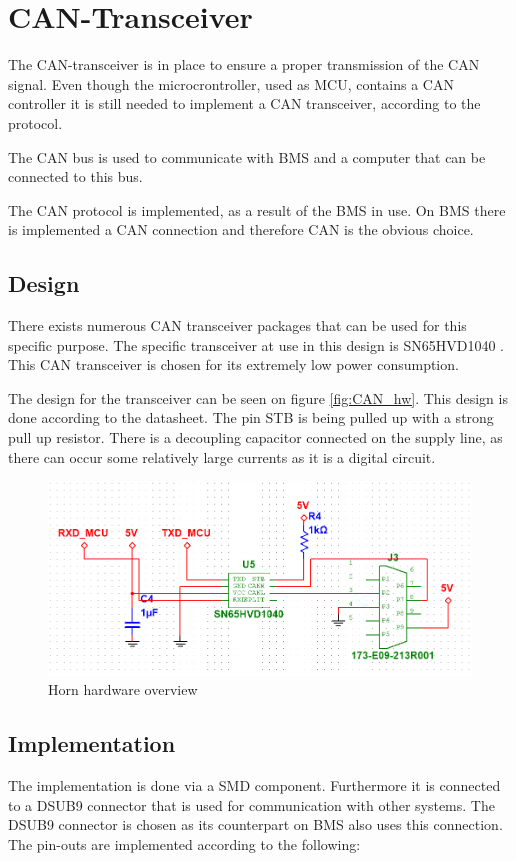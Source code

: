 \newpage
\section{CAN-Transceiver}
\label{sec:CAN-Tranceiver}
The CAN-transceiver is in place to ensure a proper transmission of the CAN signal. Even though the microcrontroller, used as MCU, contains a CAN controller it is still needed to implement a CAN transceiver, according to the protocol.

The CAN bus is used to communicate with BMS and a computer that can be connected to this bus. 

The CAN protocol is implemented, as a result of the BMS in use. On BMS there is implemented a CAN connection and therefore CAN is the obvious choice.    

\subsection{Design}
There exists numerous CAN transceiver packages that can be used for this specific purpose. The specific transceiver at use in this design is SN65HVD1040 \cite{CAN}. This CAN transceiver is chosen for its extremely low power consumption. 

The design for the transceiver can be seen on figure \vref{fig:CAN_hw}. This design is done according to the datasheet. The pin STB is being pulled up with a strong pull up resistor. There is a decoupling capacitor connected on the supply line, as there can occur some relatively large currents as it is a digital circuit. 

\begin{figure}[H]
	\centering
	\includegraphics[width=0.7\linewidth]{Hardware/Pictures/CAN_transceiver}
	\caption{Horn hardware overview}
	\label{fig:CAN_hw}
\end{figure}

\subsection{Implementation}
The implementation is done via a SMD component. Furthermore it is connected to a DSUB9 connector that is used for communication with other systems. The DSUB9 connector is chosen as its counterpart on BMS also uses this connection. The pin-outs are implemented according to the following:

